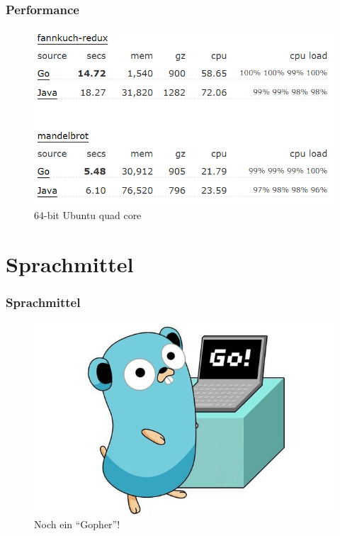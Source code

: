 \documentclass{beamer}
\begin{document}
\begin{frame}
\frametitle{Performance}

\centering
\begin{figure}
\includegraphics[scale=0.6]{performance2.png}
\caption{64-bit Ubuntu quad core}
\end{figure}

\end{frame}


\section{Sprachmittel}
\begin{frame}
\frametitle{Sprachmittel}

\centering
\begin{figure}
\includegraphics[scale=0.45]{sprachmittel.png}
\caption{Noch ein ``Gopher''!}
\end{figure}

\end{frame}
\end{document}
